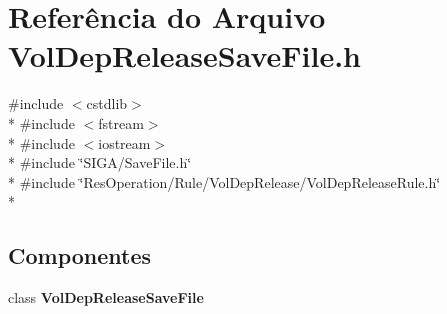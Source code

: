\section{Referência do Arquivo Vol\+Dep\+Release\+Save\+File.\+h}
\label{_vol_dep_release_save_file_8h}
{\ttfamily \#include $<$cstdlib$>$}\\*
{\ttfamily \#include $<$fstream$>$}\\*
{\ttfamily \#include $<$iostream$>$}\\*
{\ttfamily \#include \char`\"{}S\+I\+G\+A/\+Save\+File.\+h\char`\"{}}\\*
{\ttfamily \#include \char`\"{}Res\+Operation/\+Rule/\+Vol\+Dep\+Release/\+Vol\+Dep\+Release\+Rule.\+h\char`\"{}}\\*
\subsection*{Componentes}
\begin{DoxyCompactItemize}
\item 
class {\bf Vol\+Dep\+Release\+Save\+File}
\end{DoxyCompactItemize}

